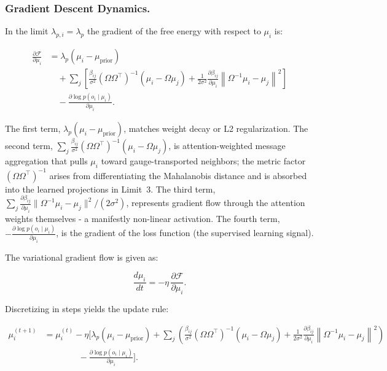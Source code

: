 \documentclass[twoside,11pt]{article}
\begin{document}
\subsubsection{Gradient Descent Dynamics.}

In the limit $\lambda_{p,i} = \lambda_p$ the gradient of the free energy with respect to $\mu_i$ is:

\begin{equation}
\boxed{
\begin{aligned}
\frac{\partial \mathcal{F}}{\partial \mu_i}
&= \lambda_p \left(\mu_i - \mu_{\text{prior}}\right) \\
&\quad + \sum_j \left[
    \frac{\beta_{ij}}{\sigma^2}(\Omega\Omega^\top)^{-1}\left(\mu_i - \Omega\mu_j\right)
    + \frac{1}{2\sigma^2}
      \frac{\partial \beta_{ij}}{\partial \mu_i}
      \left\|\Omega^{-1}\mu_i - \mu_j\right\|^2
\right] \\
&\quad - \frac{\partial \log p(o_i \mid \mu_i)}{\partial \mu_i}.
\end{aligned}
}
\end{equation}

The first term, $\lambda_p(\mu_i - \mu_{\text{prior}})$, matches weight decay or L2 regularization. The second term, $\sum_j \frac{\beta_{ij}}{\sigma^2}(\Omega\Omega^\top)^{-1}(\mu_i - \Omega\mu_j)$, is attention-weighted message aggregation that pulls $\mu_i$ toward gauge-transported neighbors; the metric factor $(\Omega\Omega^\top)^{-1}$ arises from differentiating the Mahalanobis distance and is absorbed into the learned projections in Limit~3. The third term, $\sum_j \frac{\partial \beta_{ij}}{\partial \mu_i}\|\Omega^{-1}\mu_i - \mu_j\|^2/(2\sigma^2)$, represents gradient flow through the attention weights themselves - a manifestly non-linear activation. The fourth term, $-\frac{\partial \log p(o_i \mid \mu_i)}{\partial \mu_i}$, is the gradient of the loss function (the supervised learning signal).

The variational gradient flow is given as:

\begin{equation}
\frac{d\mu_i}{dt} = -\eta \,\frac{\partial \mathcal{F}}{\partial \mu_i}.
\end{equation}

Discretizing in steps yields the update rule:

\begin{equation}
\boxed{
\begin{aligned}
\mu_i^{(t+1)}
&= \mu_i^{(t)}
- \eta \Bigg[
    \lambda_p \left(\mu_i - \mu_{\text{prior}}\right)
    + \sum_j \left(
        \frac{\beta_{ij}}{\sigma^2}(\Omega\Omega^\top)^{-1}\left(\mu_i - \Omega\mu_j\right)
        + \frac{1}{2\sigma^2}
          \frac{\partial \beta_{ij}}{\partial \mu_i}
          \left\|\Omega^{-1}\mu_i - \mu_j\right\|^2
      \right) \\
&\qquad\qquad
    - \frac{\partial \log p(o_i \mid \mu_i)}{\partial \mu_i}
\Bigg].
\end{aligned}
}
\end{equation}
\end{document}
